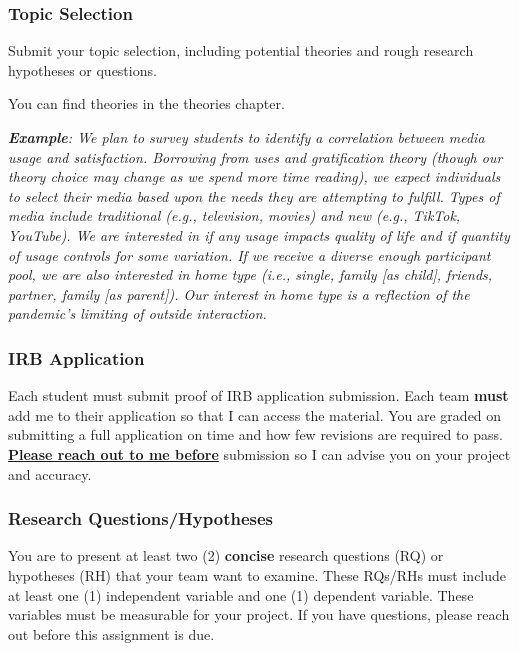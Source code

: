\documentclass[
  b5paper]{book}
\begin{document}
\hypertarget{topic-selection}{%
\subsubsection*{Topic Selection}\label{topic-selection}}

Submit your topic selection, including potential theories and rough research hypotheses or questions.

You can find theories in the theories chapter.

\emph{\textbf{Example}: We plan to survey students to identify a correlation between media usage and satisfaction. Borrowing from uses and gratification theory (though our theory choice may change as we spend more time reading), we expect individuals to select their media based upon the needs they are attempting to fulfill. Types of media include traditional (e.g., television, movies) and new (e.g., TikTok, YouTube). We are interested in if any usage impacts quality of life and if quantity of usage controls for some variation. If we receive a diverse enough participant pool, we are also interested in home type (i.e., single, family {[}as child{]}, friends, partner, family {[}as parent{]}). Our interest in home type is a reflection of the pandemic's limiting of outside interaction.}

\hypertarget{irb-application}{%
\subsubsection*{IRB Application}\label{irb-application}}

Each student must submit proof of IRB application submission. Each team \textbf{must} add me to their application so that I can access the material. You are graded on submitting a full application on time and how few revisions are required to pass. \ul{\textbf{Please reach out to me before}} submission so I can advise you on your project and accuracy.

\hypertarget{research-questionshypotheses}{%
\subsubsection*{Research Questions/Hypotheses}\label{research-questionshypotheses}}

You are to present at least two (2) \textbf{concise} research questions (RQ) or hypotheses (RH) that your team want to examine. These RQs/RHs must include at least one (1) independent variable and one (1) dependent variable. These variables must be measurable for your project. If you have questions, please reach out before this assignment is due.
\end{document}
